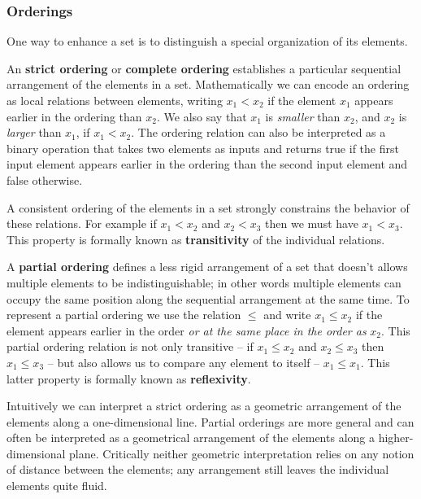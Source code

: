 \documentclass[
  letterpaper,
  DIV=11,
  numbers=noendperiod]{scrartcl}
\begin{document}
\hypertarget{orderings}{%
\subsubsection{Orderings}\label{orderings}}

One way to enhance a set is to distinguish a special organization of its
elements.

An \textbf{strict ordering} or \textbf{complete ordering} establishes a
particular sequential arrangement of the elements in a set.
Mathematically we can encode an ordering as local relations between
elements, writing \(x_{1} < x_{2}\) if the element \(x_{1}\) appears
earlier in the ordering than \(x_{2}\). We also say that \(x_{1}\) is
\emph{smaller} than \(x_{2}\), and \(x_{2}\) is \emph{larger} than
\(x_{1}\), if \(x_{1} < x_{2}\). The ordering relation can also be
interpreted as a binary operation that takes two elements as inputs and
returns true if the first input element appears earlier in the ordering
than the second input element and false otherwise.

A consistent ordering of the elements in a set strongly constrains the
behavior of these relations. For example if \(x_{1} < x_{2}\) and
\(x_{2} < x_{3}\) then we must have \(x_{1} < x_{3}\). This property is
formally known as \textbf{transitivity} of the individual relations.

A \textbf{partial ordering} defines a less rigid arrangement of a set
that doesn't allows multiple elements to be indistinguishable; in other
words multiple elements can occupy the same position along the
sequential arrangement at the same time. To represent a partial ordering
we use the relation \(\le\) and write \(x_{1} \le x_{2}\) if the element
appears earlier in the order \emph{or at the same place in the order as}
\(x_{2}\). This partial ordering relation is not only transitive -- if
\(x_{1} \le x_{2}\) and \(x_{2} \le x_{3}\) then \(x_{1} \le x_{3}\) --
but also allows us to compare any element to itself --
\(x_{1} \le x_{1}\). This latter property is formally known as
\textbf{reflexivity}.

Intuitively we can interpret a strict ordering as a geometric
arrangement of the elements along a one-dimensional line. Partial
orderings are more general and can often be interpreted as a geometrical
arrangement of the elements along a higher-dimensional plane. Critically
neither geometric interpretation relies on any notion of distance
between the elements; any arrangement still leaves the individual
elements quite fluid.
\end{document}
